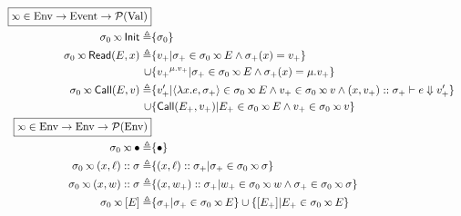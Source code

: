 \documentclass{article}
\begin{document}
\begin{figure}
	\begin{align*}
		\fbox{$\semlink\in\Ctx\rightarrow\Event\rightarrow\pset(\Value)$}                                                                                                                               \\
		\ctx_0\semlink\InitE\triangleq                         & \{\ctx_0\}                                                                                                                             \\
		\ctx_0\semlink\ReadE(\event,x)\triangleq               & \{v_+|\ctx_+\in\ctx_0\semlink\event\land\ctx_+(x)=v_+\}                                                                                \\
		\cup                                                   & \{\openloc{\mu.v_+}{v_+}|\ctx_+\in\ctx_0\semlink E\land\ctx_+(x)=\mu.v_+\}                                                             \\
		\ctx_0\semlink\CallE(\event,v)\triangleq               & \{v_+'|\langle\lambda x.e,\ctx_+\rangle\in\ctx_0\semlink E\land v_+\in\ctx_0\semlink v\land(x,v_+)\cons\ctx_+\vdash e\Downarrow v_+'\} \\
		\cup                                                   & \{\CallE(\event_+,v_+)|\event_+\in\ctx_0\semlink E\land v_+\in\ctx_0\semlink v\}                                                       \\
		\fbox{$\semlink\in\Ctx\rightarrow\Ctx\rightarrow\pset(\Ctx)$}                                                                                                                                   \\
		\ctx_0\semlink\bullet\triangleq                        & \{\bullet\}                                                                                                                            \\
		\ctx_0\semlink(x,\ell)\cons\ctx\triangleq              & \{(x,\ell)\cons\ctx_+|\ctx_+\in\ctx_0\semlink\ctx\}                                                                                    \\
		\ctx_0\semlink(x,w)\cons\ctx\triangleq                 & \{(x,w_+)\cons\ctx_+|w_+\in\ctx_0\semlink w\land\ctx_+\in\ctx_0\semlink\ctx\}                                                          \\
		\ctx_0\semlink[E]\triangleq                            & \{\ctx_+|\ctx_+\in\ctx_0\semlink\event\}\cup\{[\event_+]|\event_+\in\ctx_0\semlink\event\}                                             \\

\end{align*}
\end{figure}
\end{document}
